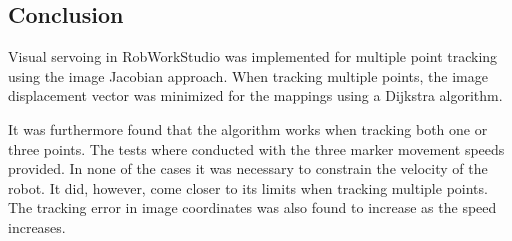 \subsection{Conclusion}
Visual servoing in RobWorkStudio was implemented for multiple point tracking using the image Jacobian approach.
When tracking multiple points, the image displacement vector was minimized for the mappings using a Dijkstra algorithm.

It was furthermore found that the algorithm works when tracking both one or three points.
The tests where conducted with the three marker movement speeds provided.
In none of the cases it was necessary to constrain the velocity of the robot.
It did, however, come closer to its limits when tracking multiple points.
The tracking error in image coordinates was also found to increase as the speed increases.